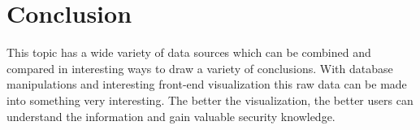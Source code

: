 \documentclass[journal]{vgtc}                %
\begin{document}
\section{Conclusion}
This topic has a wide variety of data sources which can be combined and compared in interesting ways to draw a variety of conclusions.
With database manipulations and interesting front-end visualization this raw data can be made into something very interesting.
The better the visualization, the better users can understand the information and gain valuable security knowledge.


%

%
%
%


\end{document}
